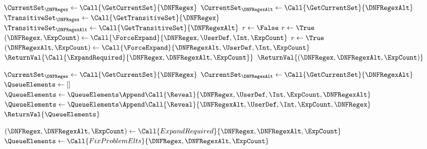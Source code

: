 \documentclass[acmsmall,screen]{acmart}
\begin{document}
\paragraph*{\Expand}
\begin{algorithm}
  \caption{\Expand{}}
  \label{alg:synthlens2}
  \begin{multicols}{2}
  \begin{algorithmic}[1]
    \State $\CurrentSet_{\DNFRegex} \gets \Call{\GetCurrentSet}{\DNFRegex}$
    \State $\CurrentSet_{\DNFRegexAlt} \gets \Call{\GetCurrentSet}{\DNFRegexAlt}$
    \State $\TransitiveSet_{\DNFRegex} \gets \Call{\GetTransitiveSet}{\DNFRegex}$
    \State $\TransitiveSet_{\DNFRegexAlt} \gets
    \Call{\GetTransitiveSet}{\DNFRegexAlt}$
    \State $r \gets \False$
    \ForEach{$(\UserDef, \Int)$}{$\CurrentSet_{\DNFRegex} \setminus
      \TransitiveSet_{\DNFRegexAlt}$}
    \State $r \gets \True$
    \State $(\DNFRegex,\ExpCount) \gets \Call{\ForceExpand}{\DNFRegex,\UserDef,\Int,\ExpCount}$
    \EndForEach
    \ForEach{$(\UserDef, \Int)$}{$\CurrentSet_{\DNFRegexAlt} \setminus
      \TransitiveSet_{\DNFRegex}$}
    \State $r \gets \True$
    \State $(\DNFRegexAlt,\ExpCount) \gets \Call{\ForceExpand}{\DNFRegexAlt,\UserDef,\Int,\ExpCount}$
    \EndForEach
    \State $\ReturnVal{\Call{\ExpandRequired}{\DNFRegex,\DNFRegexAlt,\ExpCount}}$
    \EndIf
    \State $\ReturnVal{(\DNFRegex,\DNFRegexAlt,\ExpCount)}$
    \EndFunction

    \Statex
    
    \State $\CurrentSet_{\DNFRegex} \gets \Call{\GetCurrentSet}{\DNFRegex}$
    \State $\CurrentSet_{\DNFRegexAlt} \gets
    \Call{\GetCurrentSet}{\DNFRegexAlt}$
    \State $\QueueElements \gets []$
      \ForEach{$(\UserDef, \Int)$}{$\CurrentSet_{\DNFRegexAlt} \setminus
      \CurrentSet_{\DNFRegex}$}
    \State $\QueueElements \gets \QueueElements \Append \Call{\Reveal}{\DNFRegex,\UserDef,\Int,\ExpCount,\DNFRegexAlt}$
    \EndForEach
    \ForEach{$(\UserDef, \Int)$}{$\CurrentSet_{\DNFRegex} \setminus
      \CurrentSet_{\DNFRegexAlt}$}
    \State $\QueueElements \gets \QueueElements \Append \Call{\Reveal}{\DNFRegexAlt,\UserDef,\Int,\ExpCount,\DNFRegex}$
    \EndForEach
    \State $\ReturnVal{\QueueElements}$
    \EndFunction

    \Statex
    
    \State $(\DNFRegex,\DNFRegexAlt,\ExpCount) \gets
    \Call{ExpandRequired}{\DNFRegex,\DNFRegexAlt,\ExpCount}$
    \State $\QueueElements \gets
    \Call{FixProblemElts}{\DNFRegex,\DNFRegexAlt,\ExpCount}$
    \Switch{\QueueElements}
    \CaseTwo {[]}{$\ReturnVal{\Call{\ExpandOnce}{\DNFRegex,\DNFRegexAlt,\ExpCount}}$}
    \EndCaseTwo
    \CaseTwo {\_}{$\ReturnVal{\QueueElements}$}
    \EndCaseTwo
    \EndSwitch
    \EndFunction
  \end{algorithmic}
  \end{multicols}
\end{algorithm}
\end{document}
